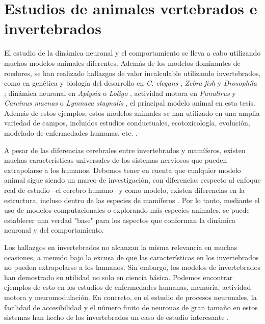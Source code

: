 \section{Estudios de animales vertebrados e invertebrados}
\label{c-intro-invertebrates spanish}
El estudio de la dinámica neuronal y el comportamiento se lleva a cabo utilizando muchos modelos animales diferentes. Además de los modelos dominantes de roedores, se han realizado hallazgos de valor incalculable utilizando invertebrados, como en genética y biología del desarrollo en \textit{C. elegans} \parencite{brenner_genetics_1974}, \textit{Zebra fish} \parencite{streisinger_production_1981} y \textit{Drosophila} \parencite{nusslein-volhard_mutations_1980}; dinámica neuronal en \textit{Aplysia} \parencite{wachtel_direct_1967} o \textit{Loligo} \parencite{hodgkin_quantitative_1952}, actividad motora en \textit{Panulirus} \parencite{selverston_stomatogastric_1976} y \textit{Carcinus maenas} \parencite{eisen_mechanisms_1982} o \textit{Lymnaea stagnalis} \parencite{benjamin_central_1979}, el principal modelo animal en esta tesis. Además de estos ejemplos, estos modelos animales se han utilizado en una amplia variedad de campos, incluidos estudios conductuales, ecotoxicología, evolución, modelado de enfermedades humanas, etc. \parencite{romanova_animal_2018}.

A pesar de las diferencias cerebrales entre invertebrados y mamíferos, existen muchas características universales de los sistemas nerviosos que pueden extrapolarse a los humanos. Debemos tener en cuenta que cualquier modelo animal sigue siendo un marco de investigación, con diferencias respecto al enfoque real de estudio --el cerebro humano-- y como modelo, existen diferencias en la estructura, incluso dentro de las especies de mamíferos \parencite{preuss_taking_2000}. Por lo tanto, mediante el uso de modelos computacionales o explorando más especies animales, se puede establecer una verdad "base" para los aspectos que conforman la dinámica neuronal y del comportamiento.

Los hallazgos en invertebrados no alcanzan la misma relevancia en muchas ocasiones, a menudo bajo la excusa de que las características en los invertebrados no pueden extrapolarse a los humanos. Sin embargo, los modelos de invertebrados han demostrado su utilidad no solo en ciencia básica. Podemos encontrar ejemplos de esto en los estudios de enfermedades humanas, memoria, actividad motora y neuromodulación. En concreto, en el estudio de procesos neuronales, la facilidad de accesibilidad y el número finito de neuronas de gran tamaño en estos sistemas han hecho de los invertebrados un caso de estudio interesante \parencite{gelperin_recent_2019}.

